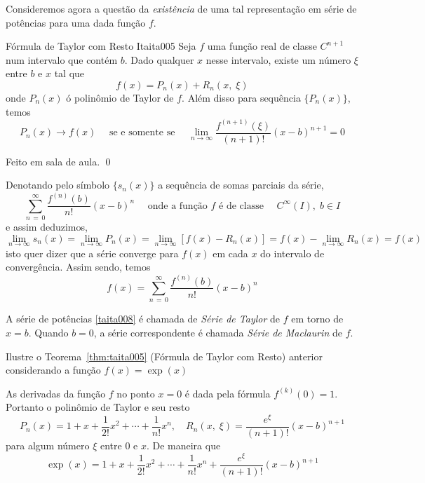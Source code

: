 Consideremos agora a questão da \textit{existência} de uma tal representação em série de potências para 
uma dada função $f$.
\begin{theoc}{Fórmula de Taylor com Resto I}{taita005}
Seja $f$ uma função real de classe $C^{n+1}$ num intervalo que contém $b$. Dado qualquer $x$ nesse 
intervalo, existe um número $\xi$ entre $b$ e $x$ tal que
\begin{equation}\label{taita006}
  f(x)=P_n(x)+R_n(x,\;\xi)
\end{equation}
onde $P_n(x)$ ó polinômio de Taylor de $f$. Além disso para sequência $\{P_n(x)\}$, temos
\begin{equation}\label{taita007}
  P_n(x)\to f(x) \quad \text{ se e somente se }\quad \lim_{n \to \infty} 
  \dfrac{f^{(n+1)}(\xi)}{(n+1)!}(x-b)^{n+1}=0
\end{equation}
\end{theoc}

\prova Feito em sala de aula. \qed

Denotando pelo símbolo $\{s_n(x)\}$ a sequência de somas parciais da série,
\begin{equation*}
  \sum_{n \,=\, 0}^{\infty} \frac{f^{(n)}(b)}{n!}(x-b)^{n}\quad \text{ onde a função $f$ é de classe } 
  \quad C^{\infty}(I),\; b\in I
\end{equation*}
e assim deduzimos,
\begin{equation*}
  \lim_{n \to \infty}s_n(x)=\lim_{n \to \infty}P_n(x)=\lim_{n \to \infty}[f(x)-R_n(x)]=
  f(x)-\lim_{n \to \infty}R_n(x)=f(x)
\end{equation*}
isto quer dizer que a série converge para $f(x)$ em cada $x$ do intervalo de convergência. Assim sendo, temos
\begin{equation}\label{taita008}
f(x)=\sum_{n \, =\, 0}^{\infty}\dfrac{f^{(n)}(b)}{n!}(x-b)^{n}
\end{equation}

A série de potências \eqref{taita008}  é chamada de \emph{Série de Taylor} de $f$ em torno de $x=b$. Quando 
$b=0$, a série correspondente é chamada \emph{Série de Maclaurin} de $f$.

\begin{exer}
Ilustre o Teorema~\ref{thm:taita005} (Fórmula de Taylor com Resto) anterior considerando a função $f(x)=\exp(x)$
\end{exer}

\solo As derivadas da função $f$ no ponto $x=0$ é dada pela fórmula $f^{(k)}(0)=1$. Portanto o polinômio de Taylor e seu resto
\begin{equation*}
P_n(x)=1+x+\frac{1}{2!}x^2+\cdots+\frac{1}{n!}x^n, \quad  R_n(x,\;\xi)=\frac{e^{\xi}}{(n+1)!}(x-b)^{n+1}
\end{equation*}
para algum número $\xi$ entre $0$ e $x$. De maneira que
\begin{equation*}
  \exp(x)=1+x+\frac{1}{2!}x^2+\cdots+\frac{1}{n!}x^n+\frac{e^{\xi}}{(n+1)!}(x-b)^{n+1}
\end{equation*}

